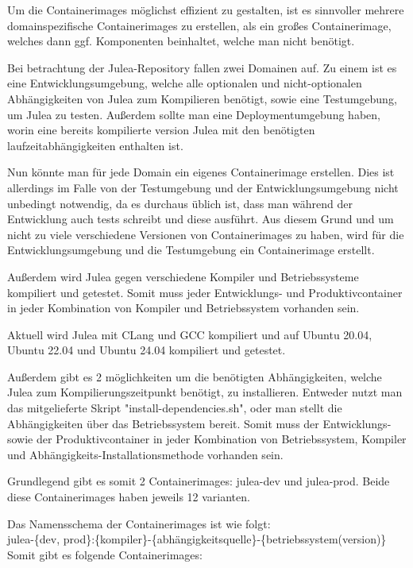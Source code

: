 Um die Containerimages möglichst effizient zu gestalten, ist es sinnvoller mehrere domainspezifische Containerimages zu erstellen, als ein großes Containerimage, welches dann ggf. Komponenten beinhaltet, welche man nicht benötigt.

Bei betrachtung der Julea-Repository fallen zwei Domainen auf. Zu einem ist es eine Entwicklungsumgebung, welche alle optionalen und nicht-optionalen Abhängigkeiten von Julea zum Kompilieren benötigt, sowie eine Testumgebung, um Julea zu testen. Außerdem sollte man eine Deploymentumgebung haben, worin eine bereits kompilierte version Julea mit den benötigten laufzeitabhängigkeiten enthalten ist.

Nun könnte man für jede Domain ein eigenes Containerimage erstellen. Dies ist allerdings im Falle von der Testumgebung und der Entwicklungsumgebung nicht unbedingt notwendig, da es durchaus üblich ist, dass man während der Entwicklung auch tests schreibt und diese ausführt. Aus diesem Grund und um nicht zu viele verschiedene Versionen von Containerimages zu haben, wird für die Entwicklungsumgebung und die Testumgebung ein Containerimage erstellt.

Außerdem wird Julea gegen verschiedene Kompiler und Betriebssysteme kompiliert und getestet. Somit muss jeder Entwicklungs- und Produktivcontainer in jeder Kombination von Kompiler und Betriebssystem vorhanden sein. 

Aktuell wird Julea mit CLang und GCC kompiliert und auf Ubuntu 20.04, Ubuntu 22.04 und Ubuntu 24.04 kompiliert und getestet.

Außerdem gibt es 2 möglichkeiten um die benötigten Abhängigkeiten, welche Julea zum Kompilierungszeitpunkt benötigt, zu installieren. Entweder nutzt man das mitgelieferte Skript "install-dependencies.sh", oder man stellt die Abhängigkeiten über das Betriebssystem bereit. Somit muss der Entwicklungs- sowie der Produktivcontainer in jeder Kombination von Betriebssystem, Kompiler und Abhängigkeits-Installationsmethode vorhanden sein.

Grundlegend gibt es somit 2 Containerimages: julea-dev und julea-prod. Beide diese Containerimages haben jeweils 12 varianten.

Das Namensschema der Containerimages ist wie folgt: \\
julea-\{dev, prod\}:\{kompiler\}-\{abhängigkeitsquelle\}-\{betriebssystem(version)\}
Somit gibt es folgende Containerimages:

